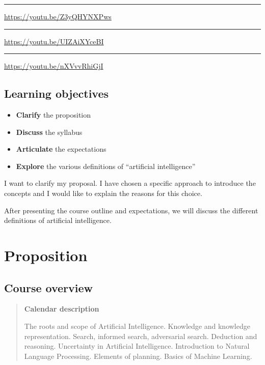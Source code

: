\documentclass[
  letterpaper,
  DIV=11,
  numbers=noendperiod]{scrartcl}
\providecommand{\tightlist}{%
  \setlength{\itemsep}{0pt}\setlength{\parskip}{0pt}}
\begin{document}
\begin{center}\rule{0.5\linewidth}{0.5pt}\end{center}

\url{https://youtu.be/Z3yQHYNXPws}

\begin{center}\rule{0.5\linewidth}{0.5pt}\end{center}

\url{https://youtu.be/UIZAiXYceBI}

\begin{center}\rule{0.5\linewidth}{0.5pt}\end{center}

\url{https://youtu.be/nXVvvRhiGjI}

\subsection{Learning objectives}\label{learning-objectives}

\begin{itemize}
\tightlist
\item
  \textbf{Clarify} the proposition
\item
  \textbf{Discuss} the syllabus
\item
  \textbf{Articulate} the expectations
\item
  \textbf{Explore} the various definitions of ``artificial
  intelligence''
\end{itemize}

I want to clarify my proposal. I have chosen a specific approach to
introduce the concepts and I would like to explain the reasons for this
choice.

After presenting the course outline and expectations, we will discuss
the different definitions of artificial intelligence.

\section{Proposition}\label{proposition}

\subsection{Course overview}\label{course-overview}

\begin{quote}
\textbf{Calendar description}

The roots and scope of Artificial Intelligence. Knowledge and knowledge
representation. Search, informed search, adversarial search. Deduction
and reasoning. Uncertainty in Artificial Intelligence. Introduction to
Natural Language Processing. Elements of planning. Basics of Machine
Learning.
\end{quote}
\end{document}
